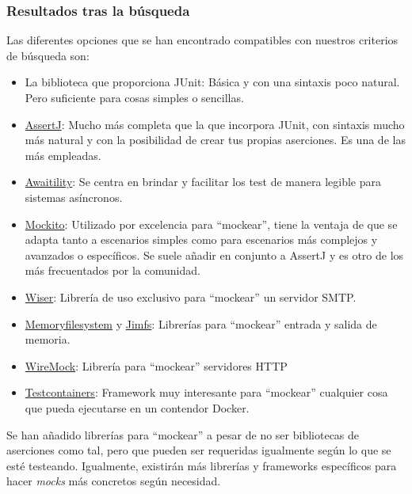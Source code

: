 \subsubsection{Resultados tras la búsqueda}

Las diferentes opciones que se han encontrado compatibles con nuestros criterios
de búsqueda son:

\begin{itemize}
    \item La biblioteca que proporciona JUnit: Básica y con una sintaxis poco
    natural. Pero suficiente para cosas simples o sencillas.
    \item \href{https://github.com/assertj/assertj}{AssertJ}: Mucho más completa
    que la que incorpora JUnit, con sintaxis mucho más natural y con la
    posibilidad de crear tus propias aserciones. Es una de las más empleadas.
    \item \href{http://www.awaitility.org/}{Awaitility}: Se centra en brindar y
    facilitar los test de manera legible para sistemas asíncronos.
    \item \href{https://site.mockito.org/}{Mockito}: Utilizado por excelencia para
    ``mockear'', tiene la ventaja de que se adapta tanto a escenarios simples
    como para escenarios más complejos y avanzados o específicos. Se suele
    añadir en conjunto a AssertJ y es otro de los más frecuentados por la comunidad.
    \item \href{https://github.com/voodoodyne/subethasmtp}{Wiser}: Librería de
    uso exclusivo para ``mockear'' un servidor SMTP. 
    \item \href{https://github.com/marschall/memoryfilesystem}{Memoryfilesystem}
    y \href{https://github.com/google/jimfs}{Jimfs}: Librerías para
    ``mockear'' entrada y salida de memoria. 
    \item \href{https://wiremock.org/docs/overview/}{WireMock}: Librería para
    ``mockear'' servidores HTTP
    \item \href{https://testcontainers.com/}{Testcontainers}: Framework muy
    interesante para ``mockear'' cualquier cosa que pueda ejecutarse en un
    contendor Docker. 
\end{itemize}

Se han añadido librerías para ``mockear'' a pesar de no ser bibliotecas de
aserciones como tal, pero que pueden ser requeridas igualmente según lo que se
esté testeando. Igualmente, existirán más librerías y frameworks específicos para hacer
\emph{mocks} más concretos según necesidad.



